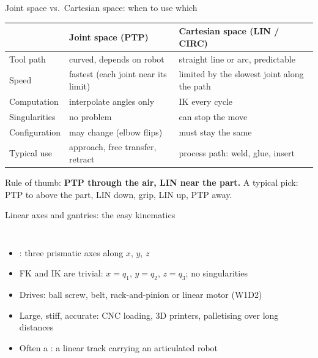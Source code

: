 \documentclass[aspectratio=169,10pt]{beamer}
\begin{document}
\begin{frame}[t]{Joint space vs.\ Cartesian space: when to use which}
\centering
\small
\begin{tabularx}{.92\textwidth}{@{}l X X@{}}
\toprule
 & \textbf{Joint space (PTP)} & \textbf{Cartesian space (LIN / CIRC)}\\
\midrule
Tool path & curved, depends on robot & straight line or arc, predictable\\
Speed & fastest (each joint near its limit) & limited by the slowest joint along the path\\
Computation & interpolate angles only & IK every cycle\\
Singularities & no problem & can stop the move\\
Configuration & may change (elbow flips) & must stay the same\\
Typical use & approach, free transfer, retract & process path: weld, glue, insert\\
\bottomrule
\end{tabularx}
\vspace{3mm}
\begin{notebox}
Rule of thumb: \textbf{PTP through the air, LIN near the part.} A typical pick: PTP to above the part, LIN down, grip, LIN up, PTP away.
\end{notebox}
\end{frame}

\begin{frame}[t]{Linear axes and gantries: the easy kinematics}
\begin{columns}[T,onlytextwidth]
\begin{itemize}\small
\item {}: three prismatic axes along $x$, $y$, $z$
\item FK and IK are trivial: $x=q_1$, $y=q_2$, $z=q_3$; no singularities
\item Drives: ball screw, belt, rack-and-pinion or linear motor (W1D2)
\item Large, stiff, accurate: CNC loading, 3D printers, palletising over long distances
\item Often a : a linear track carrying an articulated robot
\end{itemize}
\centering
{}
\end{columns}
\end{frame}
\end{document}
